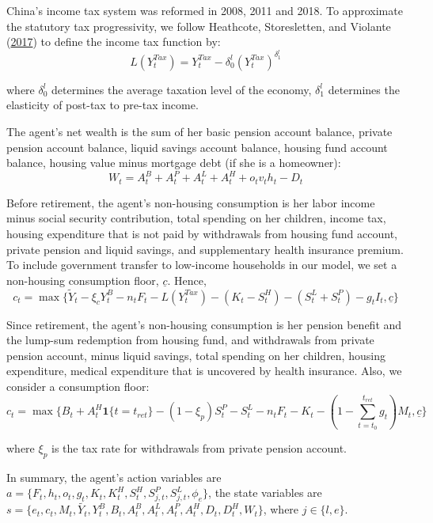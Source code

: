 \documentclass[
  12pt,
]{article}
\begin{document}
China's income tax system was reformed in 2008, 2011 and 2018. To
approximate the statutory tax progressivity, we follow Heathcote,
Storesletten, and Violante
(\protect\hyperlink{ref-heathcote_optimal_2017}{2017}) to define the
income tax function by: \begin{equation} 
L(Y^{Tax}_t)=Y^{Tax}_t - \delta^l_0 (Y^{Tax}_t)^{\delta^l_1}
\end{equation}

where \(\delta^l_0\) determines the average taxation level of the
economy, \(\delta^l_1\) determines the elasticity of post-tax to pre-tax
income.

The agent's net wealth is the sum of her basic pension account balance,
private pension account balance, liquid savings account balance, housing
fund account balance, housing value minus mortgage debt (if she is a
homeowner): \begin{equation}
W_t = A^B_t+A^P_t+A^L_t+A^H_t+o_t v_{t}h_t-D_t
\end{equation}

Before retirement, the agent's non-housing consumption is her labor
income minus social security contribution, total spending on her
children, income tax, housing expenditure that is not paid by
withdrawals from housing fund account, private pension and liquid
savings, and supplementary health insurance premium. To include
government transfer to low-income households in our model, we set a
non-housing consumption floor, \(\underline{c}\). Hence,
\begin{equation}
c_t = \max\{\tilde{Y}_t - \xi_cY^B_t - n_t F_t - L(Y^{Tax}_t)  - (K_t - S^H_t) - (S^L_t+S^P_t) - g_tI_t ,\underline{c}\}
\end{equation}

Since retirement, the agent's non-housing consumption is her pension
benefit and the lump-sum redemption from housing fund, and withdrawals
from private pension account, minus liquid savings, total spending on
her children, housing expenditure, medical expenditure that is uncovered
by health insurance. Also, we consider a consumption floor:
\begin{equation}
c_t = \max\{B_t + A^H_t \textbf{1}\{t=t_{ret}\} -(1-\xi_p)S^P_t - S^L_t - n_tF_t - K_t - (1-\sum_{t=t_0}^{t_{ret}}g_t)M_t,\underline{c}\}
\end{equation}

where \(\xi_p\) is the tax rate for withdrawals from private pension
account.

In summary, the agent's action variables are
\(a =\{F_t, h_t, o_t, g_t, K_t, K^H_t, S^H_t, S^P_{j,t}, S^L_{j,t}, \phi_e\}\),
the state variables are
\(s=\{e_t,c_t,M_t,\tilde{Y_t},Y^B_t,B_t,A^B_t,A^L_t,A^P_t,A^H_t,D_t,D^H_t,W_t\}\),
where \(j \in \{l,e\}\).
\end{document}
